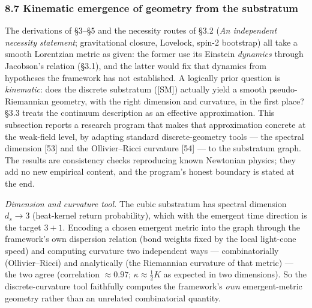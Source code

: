 \documentclass[
]{article}
\begin{document}
\hypertarget{kinematic-emergence-of-geometry-from-the-substratum}{%
\subsubsection{8.7 Kinematic emergence of geometry from the
substratum}\label{kinematic-emergence-of-geometry-from-the-substratum}}

The derivations of §3--§5 and the necessity routes of §3.2 (\emph{An
independent necessity statement}; gravitational closure, Lovelock,
spin-2 bootstrap) all take a smooth Lorentzian metric as given: the
former use its Einstein \emph{dynamics} through Jacobson's relation
(§3.1), and the latter would fix that dynamics from hypotheses the
framework has not established. A logically prior question is
\emph{kinematic}: does the discrete substratum ({[}SM{]}) actually yield
a smooth pseudo-Riemannian geometry, with the right dimension and
curvature, in the first place? §3.3 treats the continuum description as
an effective approximation. This subsection reports a research program
that makes that approximation concrete at the weak-field level, by
adapting standard discrete-geometry tools --- the spectral dimension
{[}53{]} and the Ollivier--Ricci curvature {[}54{]} --- to the
substratum graph. The results are consistency checks reproducing known
Newtonian physics; they add no new empirical content, and the program's
honest boundary is stated at the end.

\emph{Dimension and curvature tool.} The cubic substratum has spectral
dimension \(d_s \to 3\) (heat-kernel return probability), which with the
emergent time direction is the target \(3+1\). Encoding a chosen
emergent metric into the graph through the framework's own dispersion
relation (bond weights fixed by the local light-cone speed) and
computing curvature two independent ways --- combinatorially
(Ollivier--Ricci) and analytically (the Riemannian curvature of that
metric) --- the two agree (correlation \(\approx 0.97\);
\(\kappa \approx \tfrac12 K\) as expected in two dimensions). So the
discrete-curvature tool faithfully computes the framework's \emph{own}
emergent-metric geometry rather than an unrelated combinatorial
quantity.
\end{document}
